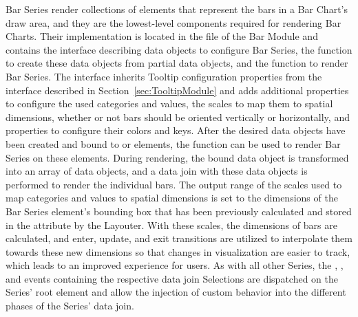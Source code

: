 Bar Series render collections of  elements that represent the bars in a Bar Chart's draw area, and they are the lowest-level components required for rendering Bar Charts.
Their implementation is located in the  file of the Bar Module and contains the  interface describing data objects to configure Bar Series, the  function to create these data objects from partial data objects, and the  function to render Bar Series.
The  interface inherits Tooltip configuration properties from the  interface described in Section~\ref{sec:TooltipModule} and adds additional properties to configure the used categories and values, the scales to map them to spatial dimensions, whether or not bars should be oriented vertically or horizontally, and properties to configure their colors and keys. 
After the desired  data objects have been created and bound to  or  elements, the  function can be used to render Bar Series on these elements.
During rendering, the bound  data object is transformed into an array of  data objects, and a data join with these data objects is performed to render the individual bars. 
The output range of the scales used to map categories and values to spatial dimensions is set to the dimensions of the Bar Series element's bounding box that has been previously calculated and stored in the  attribute by the Layouter.
With these scales, the dimensions of bars are calculated, and enter, update, and exit transitions are utilized to interpolate them towards these new dimensions so that changes in visualization are easier to track, which leads to an improved experience for users.
As with all other Series, the , , and  events containing the respective data join Selections are dispatched on the Series' root element and allow the injection of custom behavior into the different phases of the Series' data join.

